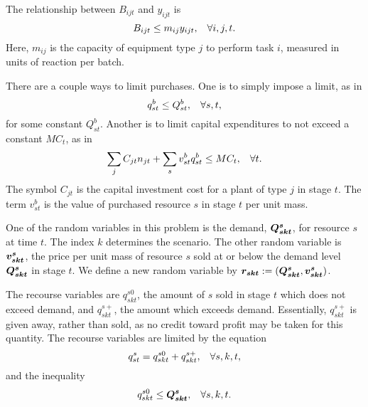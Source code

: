 The relationship between $B_{ijt}$ and $y_{ijt}$ is
\begin{equation*}
B_{ijt} \leq m_{ij} y_{ijt}, \hspace{3mm} \forall i,j,t.
\end{equation*}
Here, $m_{ij}$ is the capacity of equipment type $j$ to perform task $i$, measured in units of reaction per batch.

There are a couple ways to limit purchases.  One is to simply impose a limit, as in
\begin{equation*}
q^b_{st} \leq Q^b_{st}, \hspace{3mm} \forall s,t,
\end{equation*}
for some constant $Q^b_{st}$.  Another is to limit capital expenditures to not exceed a constant $MC_t$, as in
\begin{equation*}
\sum_{j}C_{jt}n_{jt} + \sum_s v^b_{st} q^b_{st} \leq MC_t, \hspace{3mm} \forall t.
\end{equation*}
The symbol $C_{jt}$ is the capital investment cost for a plant of type $j$ in stage $t$.  The term $v^b_{st}$ is the value of purchased resource $s$ in stage $t$ per unit mass.

One of the random variables in this problem is the demand, $\mathbf{\boldsymbol{Q^s_{skt}}}$, for resource $s$ at time $t$.  The index $k$ determines the scenario.  The other random variable is $\mathbf{\boldsymbol{v^s_{skt}}}$, the price per unit mass of resource $s$ sold at or below the demand level $\mathbf{\boldsymbol{Q^s_{skt}}}$ in stage $t$.  We define a new random variable by $\mathbf{\boldsymbol{r_{skt}}}:=(\mathbf{\boldsymbol{Q^s_{skt}}}, \mathbf{\boldsymbol{v^s_{skt}}})$.

The recourse variables are $q^{s0}_{skt}$, the amount of $s$ sold in stage $t$ which does not exceed demand, and $q^{s+}_{skt}$, the amount which exceeds demand.  Essentially, $q^{s+}_{skt}$ is given away, rather than sold, as no credit toward profit may be taken for this quantity.  The recourse variables are limited by the equation
\begin{equation*}
q^s_{st} = q^{s0}_{skt} + q^{s+}_{skt}, \hspace{3mm} \forall s,k,t,
\end{equation*}
and the inequality
\begin{equation*}
q^{s0}_{skt} \leq \mathbf{\boldsymbol{Q^s_{skt}}}, \hspace{3mm} \forall s,k,t.
\end{equation*}


